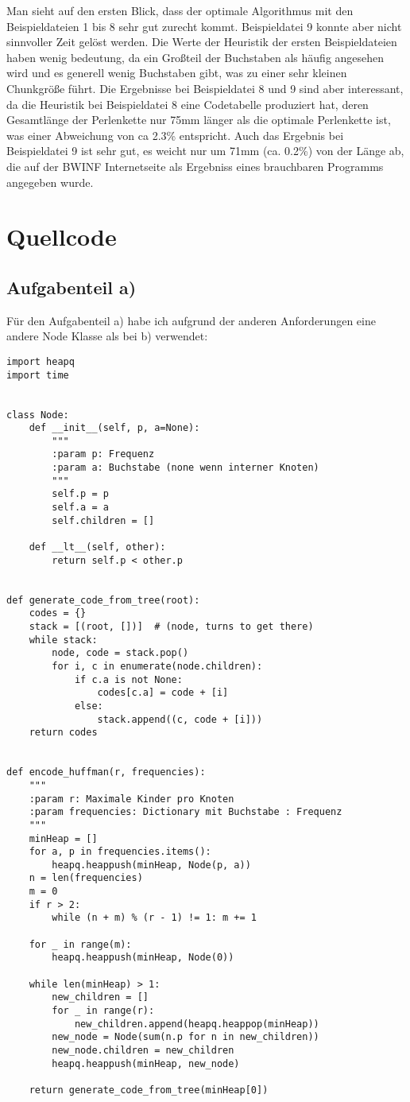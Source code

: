 \documentclass[a4paper,10pt,ngerman]{scrartcl}
\begin{document}
    Man sieht auf den ersten Blick, dass der optimale Algorithmus mit den Beispieldateien 1 bis 8 sehr gut zurecht kommt.
    Beispieldatei 9 konnte aber nicht sinnvoller Zeit gelöst werden.
    Die Werte der Heuristik der ersten Beispieldateien haben wenig bedeutung, da ein Großteil der Buchstaben als häufig angesehen wird und es generell wenig Buchstaben gibt, was zu einer sehr kleinen Chunkgröße führt.
    Die Ergebnisse bei Beispieldatei 8 und 9 sind aber interessant, da die Heuristik bei Beispieldatei 8 eine Codetabelle produziert hat, deren Gesamtlänge der Perlenkette nur 75mm länger als die optimale Perlenkette ist, was einer Abweichung von ca 2.3\% entspricht.
    Auch das Ergebnis bei Beispieldatei 9 ist sehr gut, es weicht nur um 71mm (ca. 0.2\%) von der Länge ab, die auf der BWINF Internetseite als Ergebniss eines brauchbaren Programms angegeben wurde.


    \section{Quellcode}

    \subsection{Aufgabenteil a)}
    Für den Aufgabenteil a) habe ich aufgrund der anderen Anforderungen eine andere Node Klasse als bei b) verwendet:
    \begin{verbatim}
import heapq
import time


class Node:
    def __init__(self, p, a=None):
        """
        :param p: Frequenz
        :param a: Buchstabe (none wenn interner Knoten)
        """
        self.p = p
        self.a = a
        self.children = []

    def __lt__(self, other):
        return self.p < other.p


def generate_code_from_tree(root):
    codes = {}
    stack = [(root, [])]  # (node, turns to get there)
    while stack:
        node, code = stack.pop()
        for i, c in enumerate(node.children):
            if c.a is not None:
                codes[c.a] = code + [i]
            else:
                stack.append((c, code + [i]))
    return codes


def encode_huffman(r, frequencies):
    """
    :param r: Maximale Kinder pro Knoten
    :param frequencies: Dictionary mit Buchstabe : Frequenz
    """
    minHeap = []
    for a, p in frequencies.items():
        heapq.heappush(minHeap, Node(p, a))
    n = len(frequencies)
    m = 0
    if r > 2:
        while (n + m) % (r - 1) != 1: m += 1

    for _ in range(m):
        heapq.heappush(minHeap, Node(0))

    while len(minHeap) > 1:
        new_children = []
        for _ in range(r):
            new_children.append(heapq.heappop(minHeap))
        new_node = Node(sum(n.p for n in new_children))
        new_node.children = new_children
        heapq.heappush(minHeap, new_node)

    return generate_code_from_tree(minHeap[0])
    \end{verbatim}
\end{document}
